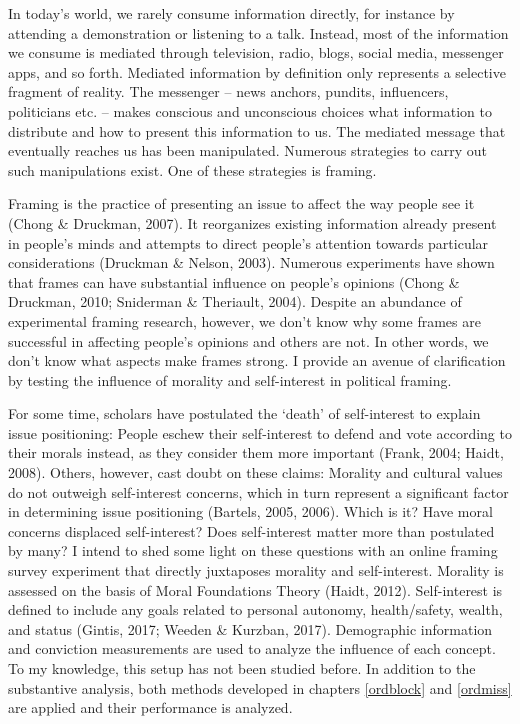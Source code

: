 \documentclass[12pt,econ]{sources/authesis}
\begin{document}
In today's world, we rarely consume information directly, for instance by attending a demonstration or listening to a talk. Instead, most of the information we consume is mediated through television, radio, blogs, social media, messenger apps, and so forth. Mediated information by definition only represents a selective fragment of reality. The messenger -- news anchors, pundits, influencers, politicians etc. -- makes conscious and unconscious choices what information to distribute and how to present this information to us. The mediated message that eventually reaches us has been manipulated. Numerous strategies to carry out such manipulations exist. One of these strategies is framing.

Framing is the practice of presenting an issue to affect the way people see it (Chong \& Druckman, 2007). It reorganizes existing information already present in people's minds and attempts to direct people's attention towards particular considerations (Druckman \& Nelson, 2003). Numerous experiments have shown that frames can have substantial influence on people's opinions (Chong \& Druckman, 2010; Sniderman \& Theriault, 2004). Despite an abundance of experimental framing research, however, we don't know why some frames are successful in affecting people's opinions and others are not. In other words, we don't know what aspects make frames strong. I provide an avenue of clarification by testing the influence of morality and self-interest in political framing.

For some time, scholars have postulated the `death' of self-interest to explain issue positioning: People eschew their self-interest to defend and vote according to their morals instead, as they consider them more important (Frank, 2004; Haidt, 2008). Others, however, cast doubt on these claims: Morality and cultural values do not outweigh self-interest concerns, which in turn represent a significant factor in determining issue positioning (Bartels, 2005, 2006). Which is it? Have moral concerns displaced self-interest? Does self-interest matter more than postulated by many? I intend to shed some light on these questions with an online framing survey experiment that directly juxtaposes morality and self-interest. Morality is assessed on the basis of Moral Foundations Theory (Haidt, 2012). Self-interest is defined to include any goals related to personal autonomy, health/safety, wealth, and status (Gintis, 2017; Weeden \& Kurzban, 2017). Demographic information and conviction measurements are used to analyze the influence of each concept. To my knowledge, this setup has not been studied before. In addition to the substantive analysis, both methods developed in chapters \ref{ordblock} and \ref{ordmiss} are applied and their performance is analyzed.
\end{document}
